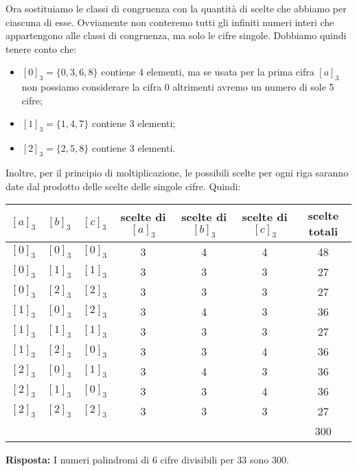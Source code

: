 \begin{soluzione}
    Ora sostituiamo le classi di congruenza con la quantità di scelte che abbiamo per ciascuna di esse.
    Ovviamente non conteremo tutti gli infiniti numeri interi che appartengono alle classi di congruenza, ma solo le
    cifre singole.
    Dobbiamo quindi tenere conto che:
    \begin{itemize}
        \item $[0]_3 = \{0, 3, 6, 8\}$ contiene 4 elementi, ma se usata per la prima cifra $[a]_3$ non possiamo
        considerare la cifra 0 altrimenti avremo un numero di sole 5 cifre;
        \item $[1]_3 = \{1, 4, 7\}$ contiene 3 elementi;
        \item $[2]_3 = \{2, 5, 8\}$ contiene 3 elementi.
    \end{itemize}

    Inoltre, per il principio di moltiplicazione, le possibili scelte per ogni riga saranno date dal prodotto delle
    scelte delle singole cifre.
    Quindi:

    \begin{table}[H]
        \label{tab:distrettuali_2019_2}
        \centering
        \begin{tabular}{ccccccc}
            \toprule
            $[a]_3$ & $[b]_3$ & $[c]_3$ & scelte di $[a]_3$ & scelte di $[b]_3$ & scelte di $[c]_3$ & scelte totali \\
            \midrule
            $[0]_3$ & $[0]_3$ & $[0]_3$ & 3 & 4 & 4 & 48 \\
            $[0]_3$ & $[1]_3$ & $[1]_3$ & 3 & 3 & 3 & 27 \\
            $[0]_3$ & $[2]_3$ & $[2]_3$ & 3 & 3 & 3 & 27 \\
            $[1]_3$ & $[0]_3$ & $[2]_3$ & 3 & 4 & 3 & 36 \\
            $[1]_3$ & $[1]_3$ & $[1]_3$ & 3 & 3 & 3 & 27 \\
            $[1]_3$ & $[2]_3$ & $[0]_3$ & 3 & 3 & 4 & 36 \\
            $[2]_3$ & $[0]_3$ & $[1]_3$ & 3 & 4 & 3 & 36 \\
            $[2]_3$ & $[1]_3$ & $[0]_3$ & 3 & 3 & 4 & 36 \\
            $[2]_3$ & $[2]_3$ & $[2]_3$ & 3 & 3 & 3 & 27 \\
            \midrule
            & & & & & & 300 \\
            \bottomrule
        \end{tabular}
    \end{table}

    \bigskip
    \textbf{Risposta:}
    I numeri palindromi di 6 cifre divisibili per 33 sono 300.
\end{soluzione}

